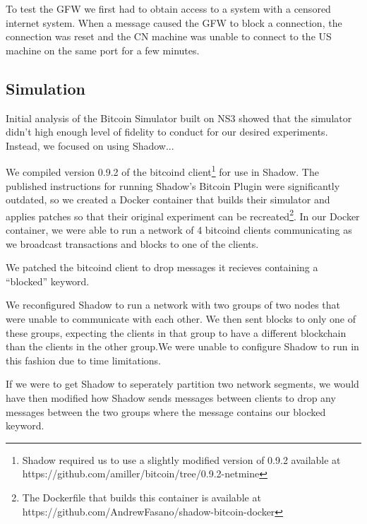 To test the GFW we first had to obtain access to a system with a censored internet system. 
When a message caused the GFW to block a connection, the connection was reset and the CN machine was unable to connect to the US machine on the same port for a few minutes.


\subsection{Simulation}
Initial analysis of the Bitcoin Simulator built on NS3 showed that the simulator didn't high enough level of fidelity to conduct for our desired experiments. Instead, we focused on using Shadow...

We compiled version 0.9.2 of the bitcoind client\footnote{Shadow required us to use a slightly modified version of 0.9.2 available at https://github.com/amiller/bitcoin/tree/0.9.2-netmine} for use in Shadow. The published instructions for running Shadow's Bitcoin Plugin were significantly outdated, so we created a Docker container that builds their simulator and applies patches so that their original experiment can be recreated\footnote{The Dockerfile that builds this container is available at https://github.com/AndrewFasano/shadow-bitcoin-docker}. In our Docker container, we were able to run a network of 4 bitcoind clients communicating as we broadcast transactions and blocks to one of the clients.

We patched the bitcoind client to drop messages it recieves containing a ``blocked'' keyword.

We reconfigured Shadow to run a network with two groups of two nodes that were unable to communicate with each other. We then sent blocks to only one of these groups, expecting the clients in that group to have a different blockchain than the clients in the other group.We were unable to configure Shadow to run in this fashion due to time limitations.

If we were to get Shadow to seperately partition two network segments, we would have then modified how Shadow sends messages between clients to drop any messages between the two groups where the message contains our blocked keyword.
